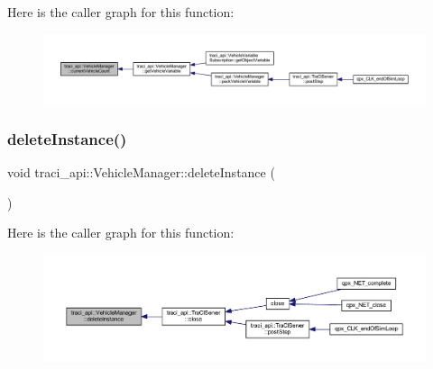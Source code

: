 Here is the caller graph for this function\+:\nopagebreak
\begin{figure}[H]
\begin{center}
\leavevmode
\includegraphics[width=350pt]{classtraci__api_1_1_vehicle_manager_a97816bd56b6f2e6949d175de86c712d6_icgraph}
\end{center}
\end{figure}
\mbox{\label{classtraci__api_1_1_vehicle_manager_ac1ff1be2d47078aae68f6ed9ef5ff187}} 
\subsubsection{\texorpdfstring{delete\+Instance()}{deleteInstance()}}
{\footnotesize\ttfamily void traci\+\_\+api\+::\+Vehicle\+Manager\+::delete\+Instance (\begin{DoxyParamCaption}{ }\end{DoxyParamCaption})\hspace{0.3cm}{\ttfamily [static]}}

Here is the caller graph for this function\+:\nopagebreak
\begin{figure}[H]
\begin{center}
\leavevmode
\includegraphics[width=350pt]{classtraci__api_1_1_vehicle_manager_ac1ff1be2d47078aae68f6ed9ef5ff187_icgraph}
\end{center}
\end{figure}
\mbox{\label{classtraci__api_1_1_vehicle_manager_a46fe50f2be4e9eb6df8f62b9a6e7aa53}} 
